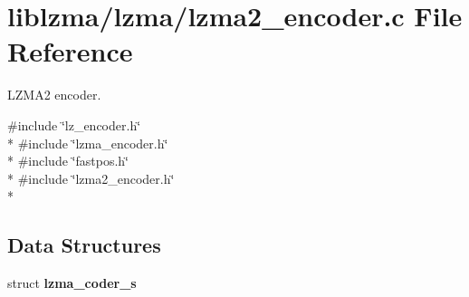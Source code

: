 \section{liblzma/lzma/lzma2\-\_\-encoder.c File Reference}
\label{lzma2__encoder_8c}


L\-Z\-M\-A2 encoder.  


{\ttfamily \#include \char`\"{}lz\-\_\-encoder.\-h\char`\"{}}\\*
{\ttfamily \#include \char`\"{}lzma\-\_\-encoder.\-h\char`\"{}}\\*
{\ttfamily \#include \char`\"{}fastpos.\-h\char`\"{}}\\*
{\ttfamily \#include \char`\"{}lzma2\-\_\-encoder.\-h\char`\"{}}\\*
\subsection*{Data Structures}
\begin{DoxyCompactItemize}
\item 
struct {\bf lzma\-\_\-coder\-\_\-s}
\end{DoxyCompactItemize}

